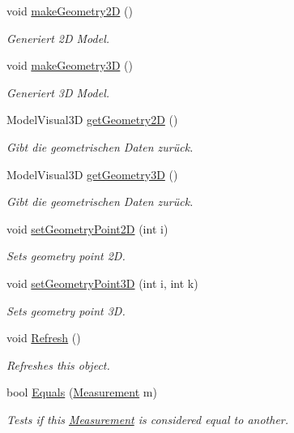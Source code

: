 \begin{DoxyCompactItemize}
void \hyperlink{class_l_i_d_a_r___w_p_f___t_e_s_t_1_1_measurement_aa6e0e356a3c30450de4f6f7f1b7846c3}{make\+Geometry2\+D} ()
\begin{DoxyCompactList}\small\item\em Generiert 2\+D Model. \end{DoxyCompactList}\item 
void \hyperlink{class_l_i_d_a_r___w_p_f___t_e_s_t_1_1_measurement_a8b3b24d0561f2d1161a314868a9ab8c0}{make\+Geometry3\+D} ()
\begin{DoxyCompactList}\small\item\em Generiert 3\+D Model. \end{DoxyCompactList}\item 
Model\+Visual3\+D \hyperlink{class_l_i_d_a_r___w_p_f___t_e_s_t_1_1_measurement_a94c0639dc9b5ff7abee8ee636afcb5b9}{get\+Geometry2\+D} ()
\begin{DoxyCompactList}\small\item\em Gibt die geometrischen Daten zurück. \end{DoxyCompactList}\item 
Model\+Visual3\+D \hyperlink{class_l_i_d_a_r___w_p_f___t_e_s_t_1_1_measurement_ada80f6a131897e7ddbe154ddac2f4ed4}{get\+Geometry3\+D} ()
\begin{DoxyCompactList}\small\item\em Gibt die geometrischen Daten zurück. \end{DoxyCompactList}\item 
void \hyperlink{class_l_i_d_a_r___w_p_f___t_e_s_t_1_1_measurement_a0204cc2acc4c4d5b857798dbdee96cb7}{set\+Geometry\+Point2\+D} (int i)
\begin{DoxyCompactList}\small\item\em Sets geometry point 2\+D. \end{DoxyCompactList}\item 
void \hyperlink{class_l_i_d_a_r___w_p_f___t_e_s_t_1_1_measurement_af6807a0e2474ce08e84838b76b9d608e}{set\+Geometry\+Point3\+D} (int i, int k)
\begin{DoxyCompactList}\small\item\em Sets geometry point 3\+D. \end{DoxyCompactList}\item 
void \hyperlink{class_l_i_d_a_r___w_p_f___t_e_s_t_1_1_measurement_adeeb69acc4ec721471620fdd7808ada1}{Refresh} ()
\begin{DoxyCompactList}\small\item\em Refreshes this object. \end{DoxyCompactList}\item 
bool \hyperlink{class_l_i_d_a_r___w_p_f___t_e_s_t_1_1_measurement_a055b0668e06da343e1f8f7d74df0664f}{Equals} (\hyperlink{class_l_i_d_a_r___w_p_f___t_e_s_t_1_1_measurement}{Measurement} m)
\begin{DoxyCompactList}\small\item\em Tests if this \hyperlink{class_l_i_d_a_r___w_p_f___t_e_s_t_1_1_measurement}{Measurement} is considered equal to another. \end{DoxyCompactList}\end{DoxyCompactItemize}
